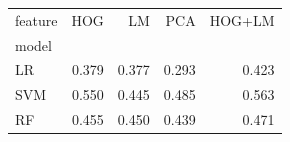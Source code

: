 \begin{tabular}{lrrrr}
\toprule
feature & HOG & LM & PCA & HOG+LM \\
model &  &  &  &  \\
\midrule
LR & 0.379 & 0.377 & 0.293 & 0.423 \\
SVM & 0.550 & 0.445 & 0.485 & 0.563 \\
RF & 0.455 & 0.450 & 0.439 & 0.471 \\
\bottomrule
\end{tabular}
